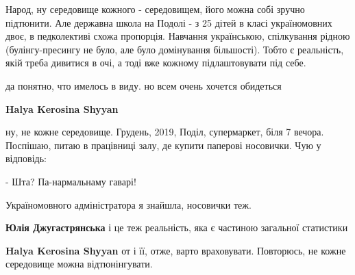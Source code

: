 \begin{itemize}
\begin{itemize}
Народ, ну середовище кожного - середовищем, його можна собі зручно підтюнити.
Але державна школа на Подолі - з 25 дітей в класі україномовних двоє, в
педколективі схожа пропорція. Навчання українською, спілкування рідною
(булінгу-пресингу не було, але було домінування більшості). Тобто є реальність,
якій треба дивитися в очі, а тоді вже кожному підлаштовувати під себе.


 

да понятно, что имелось в виду. но всем очень хочется обидеться


 
\textbf{Halya Kerosina Shyyan} 

ну, не кожне середовище. Грудень, 2019, Поділ, супермаркет, біля 7 вечора.
Поспішаю, питаю в працівниці залу, де купити паперові носовички. Чую у
відповідь:

- Шта? Па-нармальнаму гаварі!

Україномовного адміністратора я знайшла, носовички теж.

 

\textbf{Юлія Джугастрянська} і це теж реальність, яка є частиною загальної статистики

 
\textbf{Halya Kerosina Shyyan} от і її, отже, варто враховувати. Повторюсь, не кожне середовище можна відтюнінгувати.

 


\end{itemize}
\end{itemize}
